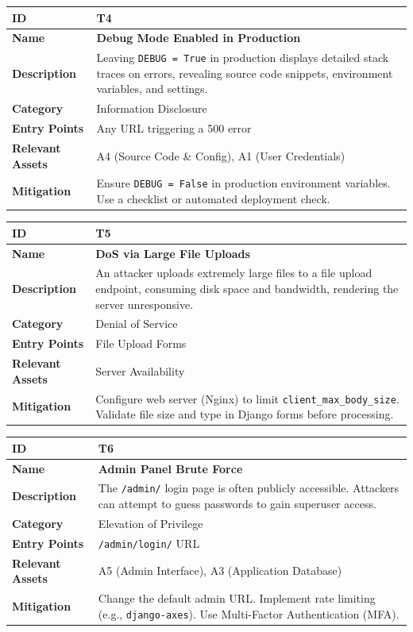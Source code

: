 \documentclass[10pt,a4paper]{article}
\begin{document}
\begin{longtable}{|p{3cm}|p{12cm}|}
\hline
\textbf{ID} & \textbf{T4} \\
\hline
\textbf{Name} & \textbf{Debug Mode Enabled in Production} \\
\hline
\textbf{Description} & Leaving \texttt{DEBUG = True} in production displays detailed stack traces on errors, revealing source code snippets, environment variables, and settings. \\
\hline
\textbf{Category} & Information Disclosure \\
\hline
\textbf{Entry Points} & Any URL triggering a 500 error \\
\hline
\textbf{Relevant Assets} & A4 (Source Code \& Config), A1 (User Credentials) \\
\hline
\textbf{Mitigation} & Ensure \texttt{DEBUG = False} in production environment variables. Use a checklist or automated deployment check. \\
\hline
\end{longtable}

\begin{longtable}{|p{3cm}|p{12cm}|}
\hline
\textbf{ID} & \textbf{T5} \\
\hline
\textbf{Name} & \textbf{DoS via Large File Uploads} \\
\hline
\textbf{Description} & An attacker uploads extremely large files to a file upload endpoint, consuming disk space and bandwidth, rendering the server unresponsive. \\
\hline
\textbf{Category} & Denial of Service \\
\hline
\textbf{Entry Points} & File Upload Forms \\
\hline
\textbf{Relevant Assets} & Server Availability \\
\hline
\textbf{Mitigation} & Configure web server (Nginx) to limit \texttt{client\_max\_body\_size}. Validate file size and type in Django forms before processing. \\
\hline
\end{longtable}

\begin{longtable}{|p{3cm}|p{12cm}|}
\hline
\textbf{ID} & \textbf{T6} \\
\hline
\textbf{Name} & \textbf{Admin Panel Brute Force} \\
\hline
\textbf{Description} & The \texttt{/admin/} login page is often publicly accessible. Attackers can attempt to guess passwords to gain superuser access. \\
\hline
\textbf{Category} & Elevation of Privilege \\
\hline
\textbf{Entry Points} & \texttt{/admin/login/} URL \\
\hline
\textbf{Relevant Assets} & A5 (Admin Interface), A3 (Application Database) \\
\hline
\textbf{Mitigation} & Change the default admin URL. Implement rate limiting (e.g., \texttt{django-axes}). Use Multi-Factor Authentication (MFA). \\
\hline
\end{longtable}
\end{document}
